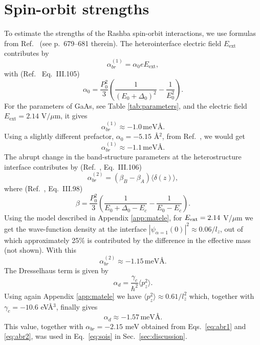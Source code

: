 \documentclass[aps,floatfix,twocolumn,showpacs,10pt,nofootinbib]{revtex4-1}
\newcommand{\be}{\begin{equation}}
\newcommand{\ee}{\end{equation}}
\begin{document}
\section{Spin-orbit strengths}

\label{app:SOI}

To estimate the strengths of the Rashba spin-orbit interactions, we use formulas from Ref.~ (see p.~679--681 therein). The heterointerface electric field $E_{\textrm{ext}}$ contributes by
\be
\alpha_{br}^{(1)} = \alpha_0 e E_{\textrm{ext}},
\ee
with (Ref.~ Eq.~III.105)
\be
\alpha_0=\frac{P_0^2}{3}\left( \frac{1}{(E_0 +\Delta_0)^{2}} - \frac{1}{E_0^{2}}\right).
\label{eq:alpha0}
\ee
For the parameters of GaAs, see Table \ref{tab:parameters}, and the electric field $E_{\textrm{ext}}=2.14$ V$/\mu$m, it gives
\be
\alpha_{br}^{(1)} \approx -1.0\,\textrm{meV\AA}.
\label{eq:abr1}
\ee
Using a slightly different prefactor, $\alpha_0=-5.15$ \AA$^2$, from Ref.~, we would get
\be
\alpha_{br}^{(1)} \approx - 1.1\, \textrm{meV\AA}.
\ee
The abrupt change in the band-structure parameters at the heterostructure interface contributes by (Ref.~, Eq.~III.106)
\be
\alpha_{br}^{(2)} = (\beta_B - \beta_A) \langle {\delta(z)} \rangle,
\ee
where (Ref.~, Eq.~III.98)
\be
\beta = \frac{P_0^2}{3}\left( \frac{1}{E_0 +\Delta_0-E_c} - \frac{1}{E_0-E_c}\right).
\label{eq:beta}
\ee
Using the model described in Appendix \ref{app:matele}, for $E_{\rm ext}=2.14$ V/$\mu$m we get the wave-function density at the interface $|\psi_{\alpha=1}(0)|^2\approx 0.06/l_z$, out of which approximately 25\% is contributed by the difference in the effective mass (not shown). With this
\be
\alpha_{br}^{(2)} \approx -1.15\, \textrm{meV\AA}.
\label{eq:abr2}
\ee
The Dresselhaus term is given by
\be
\alpha_{d} = \frac{\gamma_c}{\hbar^2} \langle {p_z^2} \rangle.
\ee
Using again Appendix \ref{app:matele} we have $\langle p_z^2\rangle \approx 0.61/l_z^2$ which, together with $\gamma_c=-10.6$ eV\AA$^3$, finally gives
\be
\alpha_{d} \approx - 1.57\, \textrm{meV\AA}.
\label{eq:ad1}
\ee
This value, together with $\alpha_{br}=-2.15$ meV obtained from Eqs.~\eqref{eq:abr1} and \eqref{eq:abr2}, was used in Eq.~\eqref{eq:sois} in Sec.~\ref{sec:discussion}.
\end{document}
